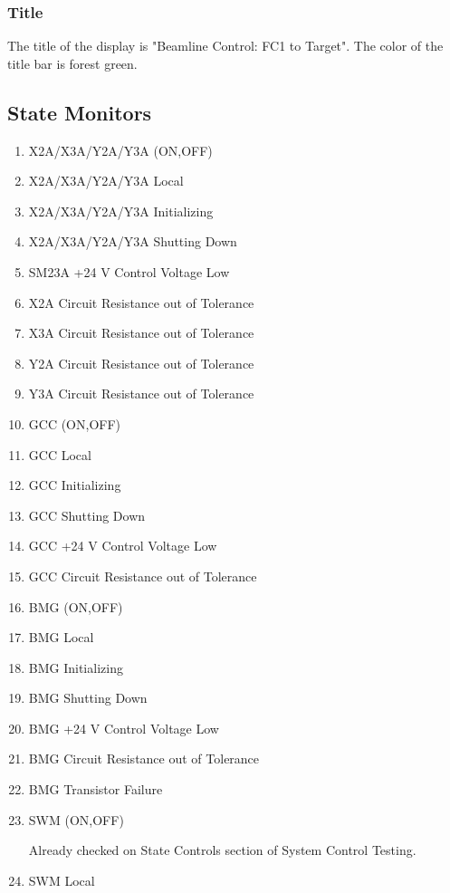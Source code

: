 \documentclass[11pt]{book}		%
\begin{document}
\subsubsection{Title}\label{sect:cyc-op-interface-status-terminal-display-contents-beamline-target-title}

The title of the display is "Beamline Control: FC1 to Target".  The color of the title bar is forest green.

\subsection{State Monitors}

\begin{enumerate}
 \item X2A/X3A/Y2A/Y3A (ON,OFF)
 \item X2A/X3A/Y2A/Y3A Local
 \item X2A/X3A/Y2A/Y3A Initializing
 \item X2A/X3A/Y2A/Y3A Shutting Down
 \item SM23A +24 V Control Voltage Low
 \item X2A Circuit Resistance out of Tolerance
 \item X3A Circuit Resistance out of Tolerance
 \item Y2A Circuit Resistance out of Tolerance
 \item Y3A Circuit Resistance out of Tolerance
 \item GCC (ON,OFF)
 \item GCC Local
 \item GCC Initializing
 \item GCC Shutting Down
 \item GCC +24 V Control Voltage Low
 \item GCC Circuit Resistance out of Tolerance
 \item BMG (ON,OFF)
 \item BMG Local
 \item BMG Initializing
 \item BMG Shutting Down
 \item BMG +24 V Control Voltage Low
 \item BMG Circuit Resistance out of Tolerance
 \item BMG Transistor Failure
 \item SWM (ON,OFF)

\color{red}
Already checked on State Controls section of System Control Testing.
\color{black}

 \item SWM Local


\end{enumerate}
\end{document}
